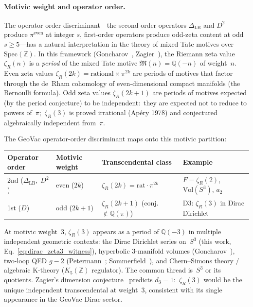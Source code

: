 \documentclass[aps,pra,twocolumn,superscriptaddress,longbibliography]{revtex4-2}
\begin{document}
\paragraph{Motivic weight and operator order.}
The operator-order discriminant---the second-order operators
$\Delta_{\mathrm{LB}}$ and $D^2$ produce $\pi^{\text{even}}$ at integer
$s$, first-order operators produce odd-zeta content at odd $s \ge 5$---has a natural interpretation in the theory of mixed Tate
motives over $\mathrm{Spec}(\mathbb{Z})$.  In this framework
(Goncharov~\cite{goncharov1999}, Zagier~\cite{zagier1994}), the Riemann
zeta value $\zeta_R(n)$ is a \emph{period} of the mixed Tate motive
$\mathfrak{M}(n) = \mathbb{Q}(-n)$ of weight~$n$.  Even zeta values
$\zeta_R(2k) = \text{rational} \times \pi^{2k}$ are periods of motives
that factor through the de~Rham cohomology of even-dimensional compact
manifolds (the Bernoulli formula).  Odd zeta values $\zeta_R(2k{+}1)$
are periods of motives expected (by the period conjecture) to be
independent:\ they are expected not to reduce to powers of~$\pi$;\
$\zeta_R(3)$ is proved irrational (Ap\'ery 1978) and conjectured
algebraically independent from~$\pi$.

The GeoVac operator-order discriminant maps onto this motivic
partition:
\begin{center}
\begin{tabular}{llll}
  \hline
  Operator order & Motivic weight & Transcendental class & Example \\
  \hline
  2nd ($\Delta_{\text{LB}},\; D^2$)
    & even ($2k$) & $\zeta_R(2k) = \text{rat} \cdot \pi^{2k}$
    & $F = \zeta_R(2)$, $\mathrm{Vol}(S^3)$, $a_2$ \\
  1st ($D$)
    & odd ($2k{+}1$) & $\zeta_R(2k{+}1)$ (conj.\ $\notin \mathbb{Q}(\pi)$)
    & D3: $\zeta_R(3)$ in Dirac Dirichlet \\
  \hline
\end{tabular}
\end{center}

At motivic weight~3, $\zeta_R(3)$ appears as a period of
$\mathbb{Q}(-3)$ in multiple independent geometric contexts:
the Dirac Dirichlet series on~$S^3$ (this work,
Eq.~\ref{eq:dirac_zeta3_witness}), hyperbolic 3-manifold volumes
(Goncharov~\cite{goncharov1999}), two-loop QED $g{-}2$
(Petermann~\cite{petermann1957}; Sommerfield~\cite{sommerfield1957}),
and Chern--Simons theory / algebraic K-theory
($K_5(\mathbb{Z})$ regulator).  The common thread is~$S^3$ or its
quotients.  Zagier's dimension conjecture~\cite{zagier1994} predicts
$d_3 = 1$:\ $\zeta_R(3)$ would be the unique independent transcendental
at weight~3, consistent with its single appearance in the GeoVac
Dirac sector.
\end{document}
